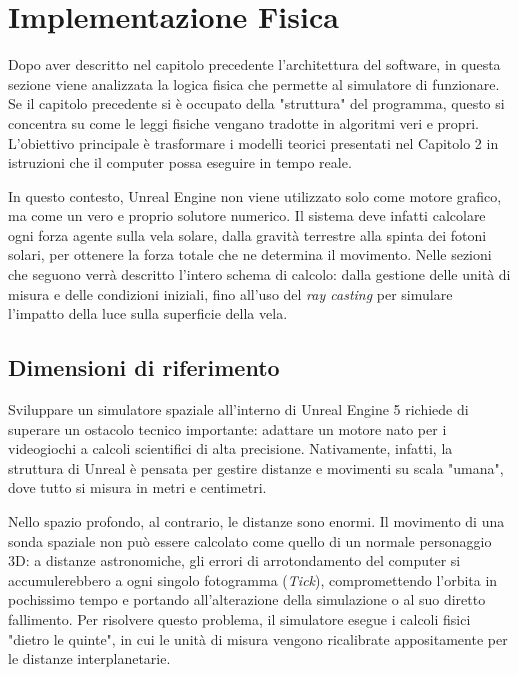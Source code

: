 \chapter{Implementazione Fisica}
\label{chap:implementazione_fisica}

Dopo aver descritto nel capitolo precedente l'architettura del software, in questa sezione viene analizzata la logica fisica che permette al simulatore di funzionare. Se il capitolo precedente si è occupato della "struttura" del programma, questo si concentra su come le leggi fisiche vengano tradotte in algoritmi veri e propri. L’obiettivo principale è trasformare i modelli teorici presentati nel Capitolo 2 in istruzioni che il computer possa eseguire in tempo reale.

In questo contesto, Unreal Engine non viene utilizzato solo come motore grafico, ma come un vero e proprio solutore numerico. Il sistema deve infatti calcolare ogni forza agente sulla vela solare, dalla gravità terrestre alla spinta dei fotoni solari, per ottenere la forza totale che ne determina il movimento. Nelle sezioni che seguono verrà descritto l'intero schema di calcolo: dalla gestione delle unità di misura e delle condizioni iniziali, fino all'uso del \textit{ray casting} per simulare l'impatto della luce sulla superficie della vela.


\section{Dimensioni di riferimento}

Sviluppare un simulatore spaziale all'interno di Unreal Engine 5 richiede di superare un ostacolo tecnico importante: adattare un motore nato per i videogiochi a calcoli scientifici di alta precisione. Nativamente, infatti, la struttura di Unreal è pensata per gestire distanze e movimenti su scala "umana", dove tutto si misura in metri e centimetri.

Nello spazio profondo, al contrario, le distanze sono enormi. Il movimento di una sonda spaziale non può essere calcolato come quello di un normale personaggio 3D: a distanze astronomiche, gli errori di arrotondamento del computer si accumulerebbero a ogni singolo fotogramma (\textit{Tick}), compromettendo l'orbita in pochissimo tempo e portando all'alterazione della simulazione o al suo diretto fallimento. Per risolvere questo problema, il simulatore esegue i calcoli fisici "dietro le quinte", in cui le unità di misura vengono ricalibrate appositamente per le distanze interplanetarie.

